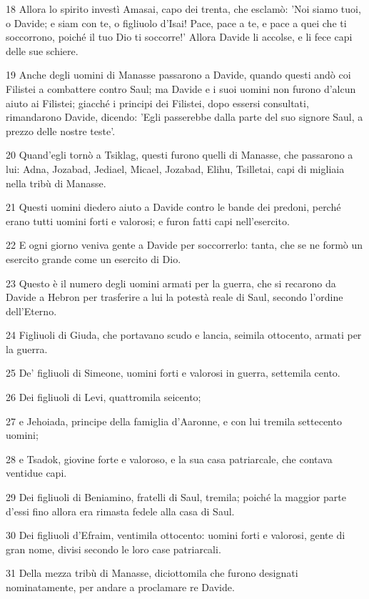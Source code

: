 \par 18 Allora lo spirito investì Amasai, capo dei trenta, che esclamò: 'Noi siamo tuoi, o Davide; e siam con te, o figliuolo d'Isai! Pace, pace a te, e pace a quei che ti soccorrono, poiché il tuo Dio ti soccorre!' Allora Davide li accolse, e li fece capi delle sue schiere.
\par 19 Anche degli uomini di Manasse passarono a Davide, quando questi andò coi Filistei a combattere contro Saul; ma Davide e i suoi uomini non furono d'alcun aiuto ai Filistei; giacché i principi dei Filistei, dopo essersi consultati, rimandarono Davide, dicendo: 'Egli passerebbe dalla parte del suo signore Saul, a prezzo delle nostre teste'.
\par 20 Quand'egli tornò a Tsiklag, questi furono quelli di Manasse, che passarono a lui: Adna, Jozabad, Jediael, Micael, Jozabad, Elihu, Tsilletai, capi di migliaia nella tribù di Manasse.
\par 21 Questi uomini diedero aiuto a Davide contro le bande dei predoni, perché erano tutti uomini forti e valorosi; e furon fatti capi nell'esercito.
\par 22 E ogni giorno veniva gente a Davide per soccorrerlo: tanta, che se ne formò un esercito grande come un esercito di Dio.
\par 23 Questo è il numero degli uomini armati per la guerra, che si recarono da Davide a Hebron per trasferire a lui la potestà reale di Saul, secondo l'ordine dell'Eterno.
\par 24 Figliuoli di Giuda, che portavano scudo e lancia, seimila ottocento, armati per la guerra.
\par 25 De' figliuoli di Simeone, uomini forti e valorosi in guerra, settemila cento.
\par 26 Dei figliuoli di Levi, quattromila seicento;
\par 27 e Jehoiada, principe della famiglia d'Aaronne, e con lui tremila settecento uomini;
\par 28 e Tsadok, giovine forte e valoroso, e la sua casa patriarcale, che contava ventidue capi.
\par 29 Dei figliuoli di Beniamino, fratelli di Saul, tremila; poiché la maggior parte d'essi fino allora era rimasta fedele alla casa di Saul.
\par 30 Dei figliuoli d'Efraim, ventimila ottocento: uomini forti e valorosi, gente di gran nome, divisi secondo le loro case patriarcali.
\par 31 Della mezza tribù di Manasse, diciottomila che furono designati nominatamente, per andare a proclamare re Davide.
